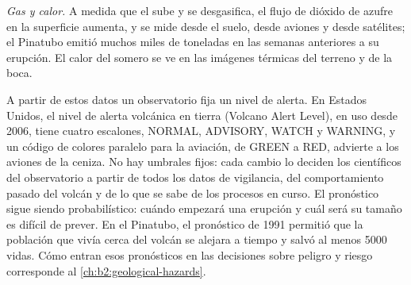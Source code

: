 \begin{omfigure}
\centering
{}
\par{}
\end{omfigure}

\emph{Gas y calor.} A medida que el  sube y se desgasifica, el flujo de dióxido de azufre en la
superficie aumenta, y se mide desde el suelo, desde aviones y desde
satélites; el Pinatubo emitió muchos miles de toneladas en las semanas anteriores a su erupción.
El calor del  somero se ve en las imágenes térmicas del terreno y de la boca.

A partir de estos datos un observatorio fija un nivel de alerta. En Estados Unidos, el
nivel de alerta volcánica en tierra (Volcano Alert Level), en uso desde 2006, tiene cuatro escalones, NORMAL,
ADVISORY, WATCH y WARNING, y un código de colores paralelo para la aviación, de GREEN a RED,
advierte a los aviones de la ceniza. No hay umbrales fijos: cada cambio lo deciden
los científicos del observatorio a partir de todos los datos de vigilancia, del comportamiento pasado
del volcán y de lo que se sabe de los procesos en curso. El pronóstico sigue siendo
probabilístico: cuándo empezará una erupción y cuál será su tamaño es difícil de
prever. En el Pinatubo, el pronóstico de 1991 permitió que la población que vivía cerca del
volcán se alejara a tiempo y salvó al menos \num{5000} vidas. Cómo entran esos pronósticos
en las decisiones sobre peligro y riesgo corresponde al \cref{ch:b2:geological-hazards}.

